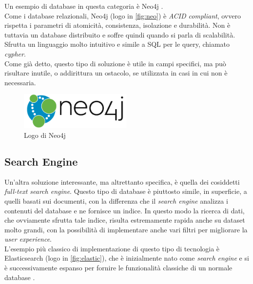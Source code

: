 \noindent Un esempio di database in questa categoria è Neo4j \cite{site:udemyneo4j}.\\
Come i database relazionali, Neo4j (logo in \autoref{fig:neo}) è \textit{ACID compliant}, ovvero rispetta i parametri di atomicità, consistenza, isolazione e durabilità. Non è tuttavia un \gls{database distribuito} e soffre quindi quando si parla di scalabilità.\\
Sfrutta un linguaggio molto intuitivo e simile a \gls{SQL} per le query, chiamato \textit{cypher}.\\

\noindent Come già detto, questo tipo di soluzione è utile in campi specifici, ma può risultare inutile, o addirittura un ostacolo, se utilizzata in casi in cui non è necessaria.

\begin{figure}[htbp]
\begin{center}
\includegraphics[height=5em]{immagini/tecnologies-logos/neo4j-logo.png}
\caption{Logo di Neo4j}
\label{fig:neo}
\end{center}
\end{figure}

\subsection{Search Engine}
Un'altra soluzione interessante, ma altrettanto specifica, è quella dei cosiddetti \textit{full-text search engine}. Questo tipo di database è piuttosto simile, in superficie, a quelli basati sui documenti, con la differenza che il \textit{search engine} analizza i contenuti del database e ne fornisce un indice. In questo modo la ricerca di dati, che ovviamente sfrutta tale indice, risulta estremamente rapida anche su dataset molto grandi, con la possibilità di implementare anche vari filtri per migliorare la \textit{user experience}.\\

\noindent L'esempio più classico di implementazione di questo tipo di tecnologia è Elasticsearch (logo in \autoref{fig:elastic}), che è inizialmente nato come \textit{search engine} e si è successivamente espanso per fornire le funzionalità classiche di un normale database \cite{site:udemyelasticsearch}.

